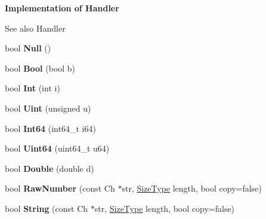\begin{Indent}\textbf{ Implementation of Handler}\par
{\em \begin{DoxySeeAlso}{See also}
Handler 
\end{DoxySeeAlso}
}\begin{DoxyCompactItemize}
\item 
\mbox{\label{class_pretty_writer_aa144f2d0f0c3c69248cdbe957349528c}} 
bool {\bfseries Null} ()
\item 
\mbox{\label{class_pretty_writer_a6e765ee7ada5ed40f317c78a98f6f90b}} 
bool {\bfseries Bool} (bool b)
\item 
\mbox{\label{class_pretty_writer_aa1815263e61cb7af3b6dfba480a0f481}} 
bool {\bfseries Int} (int i)
\item 
\mbox{\label{class_pretty_writer_a8c82302877a5588eae77eb7d042c49ef}} 
bool {\bfseries Uint} (unsigned u)
\item 
\mbox{\label{class_pretty_writer_ad42b797429f4ee19efdce610f5aff976}} 
bool {\bfseries Int64} (int64\+\_\+t i64)
\item 
\mbox{\label{class_pretty_writer_aba75ac1f13c2629b2a55ffbf3d8a116c}} 
bool {\bfseries Uint64} (uint64\+\_\+t u64)
\item 
\mbox{\label{class_pretty_writer_ad9d592e86b985da666665926e87db415}} 
bool {\bfseries Double} (double d)
\item 
\mbox{\label{class_pretty_writer_a3941bc21d6a261ca8a86eff330db30ef}} 
bool {\bfseries Raw\+Number} (const Ch $\ast$str, \hyperlink{rapidjson_8h_a5ed6e6e67250fadbd041127e6386dcb5}{Size\+Type} length, bool copy=false)
\item 
\mbox{\label{class_pretty_writer_ae544ccfe35dd7e80ed694873062409f6}} 
bool {\bfseries String} (const Ch $\ast$str, \hyperlink{rapidjson_8h_a5ed6e6e67250fadbd041127e6386dcb5}{Size\+Type} length, bool copy=false)
\item 
\mbox{\label{class_pretty_writer_a27bdda225dc152b8974e44c1df7525b7}} 

\end{DoxyCompactItemize}
\end{Indent}
